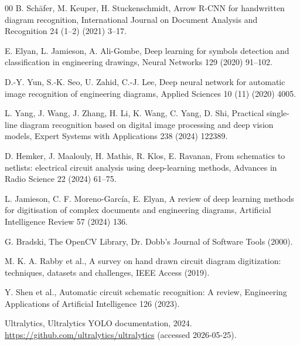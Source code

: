 \begin{thebibliography}{00}
B. Sch{\"a}fer, M. Keuper, H. Stuckenschmidt, Arrow R-CNN for handwritten diagram recognition, International Journal on Document Analysis and Recognition 24 (1--2) (2021) 3--17.

E. Elyan, L. Jamieson, A. Ali-Gombe, Deep learning for symbols detection and classification in engineering drawings, Neural Networks 129 (2020) 91--102.

D.-Y. Yun, S.-K. Seo, U. Zahid, C.-J. Lee, Deep neural network for automatic image recognition of engineering diagrams, Applied Sciences 10 (11) (2020) 4005.

L. Yang, J. Wang, J. Zhang, H. Li, K. Wang, C. Yang, D. Shi, Practical single-line diagram recognition based on digital image processing and deep vision models, Expert Systems with Applications 238 (2024) 122389.

D. Hemker, J. Maalouly, H. Mathis, R. Klos, E. Ravanan, From schematics to netlists: electrical circuit analysis using deep-learning methods, Advances in Radio Science 22 (2024) 61--75.

L. Jamieson, C. F. Moreno-Garc{\'i}a, E. Elyan, A review of deep learning methods for digitisation of complex documents and engineering diagrams, Artificial Intelligence Review 57 (2024) 136.

G. Bradski, The OpenCV Library, Dr. Dobb's Journal of Software Tools (2000).

M. K. A. Rabby et al., A survey on hand drawn circuit diagram digitization: techniques, datasets and challenges, IEEE Access (2019).

Y. Shen et al., Automatic circuit schematic recognition: A review, Engineering Applications of Artificial Intelligence 126 (2023).

Ultralytics, Ultralytics YOLO documentation, 2024. \url{https://github.com/ultralytics/ultralytics} (accessed 2026-05-25).

\end{thebibliography}
